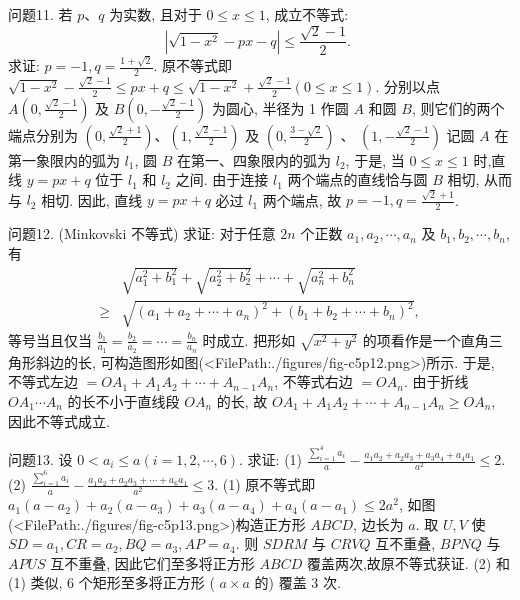 问题11. 若 $p 、 q$ 为实数, 且对于 $0 \leqslant x \leqslant 1$, 成立不等式:
$$
\left|\sqrt{1-x^2}-p x-q\right| \leqslant \frac{\sqrt{2}-1}{2} \text {. }
$$
求证: $p=-1, q=\frac{1+\sqrt{2}}{2}$.
原不等式即 $\sqrt{1-x^2}-\frac{\sqrt{2}-1}{2} \leqslant p x+q \leqslant \sqrt{1-x^2}+\frac{\sqrt{2}-1}{2}(0 \leqslant x \leqslant 1)$.
分别以点 $A\left(0, \frac{\sqrt{2}-1}{2}\right)$ 及 $B\left(0,-\frac{\sqrt{2}-1}{2}\right)$ 为圆心, 半径为 1 作圆 $A$ 和圆 $B$, 则它们的两个端点分别为 $\left(0, \frac{\sqrt{2}+1}{2}\right) 、\left(1, \frac{\sqrt{2}-1}{2}\right)$ 及 $\left(0, \frac{3-\sqrt{2}}{2}\right)$ 、 $\left(1,-\frac{\sqrt{2}-1}{2}\right)$
记圆 $A$ 在第一象限内的弧为 $l_1$, 圆 $B$ 在第一、四象限内的弧为 $l_2$, 于是, 当 $0 \leqslant x \leqslant 1$ 时,直线 $y=p x+q$ 位于 $l_1$ 和 $l_2$ 之间.
由于连接 $l_1$ 两个端点的直线恰与圆 $B$ 相切, 从而与 $l_2$ 相切.
因此, 直线 $y=p x+q$ 必过 $l_1$ 两个端点, 故 $p=-1, q=\frac{\sqrt{2}+1}{2}$.



问题12. (Minkovski 不等式) 求证: 对于任意 $2 n$ 个正数 $a_1, a_2, \cdots, a_n$ 及 $b_1, b_2, \cdots, b_n$, 有
$$
\begin{aligned}
& \sqrt{a_1^2+b_1^2}+\sqrt{a_2^2+b_2^2}+\cdots+\sqrt{a_n^2+b_n^2} \\
\geqslant & \sqrt{\left(a_1+a_2+\cdots+a_n\right)^2+\left(b_1+b_2+\cdots+b_n\right)^2},
\end{aligned}
$$
等号当且仅当 $\frac{b_1}{a_1}=\frac{b_2}{a_2}=\cdots=\frac{b_n}{a_n}$ 时成立.
把形如 $\sqrt{x^2+y^2}$ 的项看作是一个直角三角形斜边的长, 可构造图形如图(<FilePath:./figures/fig-c5p12.png>)所示.
于是, 不等式左边 $=O A_1+A_1 A_2+\cdots+A_{n-1} A_n$, 不等式右边 $=O A_n$.
由于折线 $O A_1 \cdots A_n$ 的长不小于直线段 $O A_n$ 的长, 故 $O A_1+A_1 A_2+\cdots+ A_{n-1} A_n \geqslant O A_n$, 因此不等式成立.



问题13. 设 $0<a_i \leqslant a(i=1,2, \cdots, 6)$. 求证:
(1) $\frac{\sum_{i=1}^4 a_i}{a}-\frac{a_1 a_2+a_2 a_3+a_3 a_4+a_4 a_1}{a^2} \leqslant 2$.
(2) $\frac{\sum_{i=1}^6 a_i}{a}-\frac{a_1 a_2+a_2 a_3+\cdots+a_6 a_1}{a^2} \leqslant 3$.
(1) 原不等式即 $a_1\left(a-a_2\right)+a_2\left(a-a_3\right)+a_3\left(a-a_4\right)+a_4\left(a-a_1\right) \leqslant 2 a^2$, 如图(<FilePath:./figures/fig-c5p13.png>)构造正方形 $A B C D$, 边长为 $a$.
取 $U, V$ 使 $S D=a_1, C R=a_2, B Q=a_3, A P=a_4$.
则 $S D R M$ 与 $C R V Q$ 互不重叠, $B P N Q$ 与 $A P U S$ 互不重叠, 因此它们至多将正方形 $A B C D$ 覆盖两次,故原不等式获证.
(2) 和 (1) 类似, 6 个矩形至多将正方形 ( $a \times a$ 的) 覆盖 3 次.



